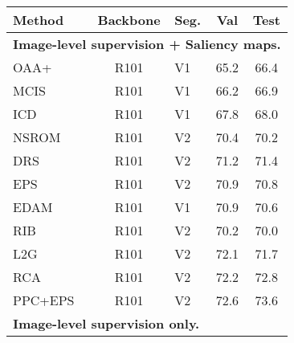 \documentclass[10pt,twocolumn,letterpaper]{article}
\begin{document}
\begin{table}
  \centering
  \begin{tabular}{lclcc}
    \toprule
    Method  & Backbone   & Seg.    & Val   & Test \\
    \midrule
    \multicolumn{5}{l}{\textbf{Image-level supervision + Saliency maps.}} \\
    
    OAA+~\cite{Jiang2019OOA}      & R101       & V1    & 65.2  & 66.4\\
    MCIS~\cite{Sun2020MCIS}      & R101       & V1    & 66.2  & 66.9 \\
    ICD~\cite{Fan2020ICD}       & R101       & V1    & 67.8  & 68.0 \\
NSROM~\cite{Yao2021NSROM}     & R101       & V2    & 70.4  & 70.2 \\
    DRS~\cite{kim2021discriminative}       & R101       & V2    & 71.2  & 71.4 \\
    EPS~\cite{Lee2021EPS}       & R101       & V2    & 70.9  & 70.8 \\
    EDAM~\cite{Wu2021EmbeddedDA}      & R101       & V1    & 70.9  & 70.6 \\
RIB~\cite{Lee2021ReducingIB}       & R101       & V2               & 70.2  & 70.0 \\
    L2G~\cite{jiang2022l2g}       & R101       & V2    & 72.1  & 71.7 \\
    RCA~\cite{zhou2022regional}       & R101       & V2    & 72.2  & 72.8 \\
    PPC+EPS~\cite{du2022weakly}   & R101       & V2               & 72.6  & 73.6 \\
    \midrule
    \multicolumn{5}{l}{\textbf{Image-level supervision only.}} \\
    

\end{tabular}
\end{table}
\end{document}

